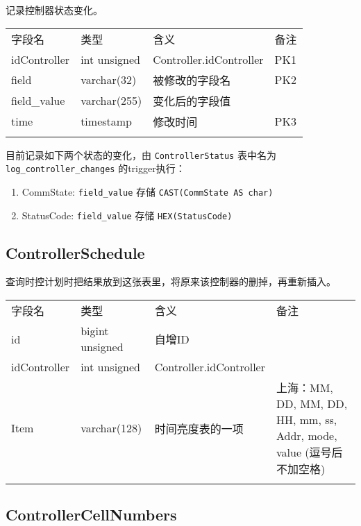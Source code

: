 记录控制器状态变化。

\begin{longtabu}[c]{@{}lXXX@{}}
\toprule\addlinespace
字段名 & 类型 & 含义 & 备注
\\\addlinespace
\midrule\endhead
idController & int unsigned & Controller.idController & PK1
\\\addlinespace
field & varchar(32) & 被修改的字段名 & PK2
\\\addlinespace
field\_value & varchar(255) & 变化后的字段值
\\\addlinespace
time & timestamp & 修改时间 & PK3
\\\addlinespace
\bottomrule
\end{longtabu}

目前记录如下两个状态的变化，由 \texttt{ControllerStatus} 表中名为
\texttt{log\_controller\_changes} 的trigger执行：

\begin{enumerate}
\def\labelenumi{\arabic{enumi}.}
\itemsep1pt\parskip0pt
\item
  CommState: \texttt{field\_value} 存储 \texttt{CAST(CommState AS char)}
\item
  StatusCode: \texttt{field\_value} 存储 \texttt{HEX(StatusCode)}
\end{enumerate}

\subsection{ControllerSchedule}\label{controllerschedule}

查询时控计划时把结果放到这张表里，将原来该控制器的删掉，再重新插入。

\begin{longtabu}[c]{@{}lXXX@{}}
\toprule\addlinespace
字段名 & 类型 & 含义 & 备注
\\\addlinespace
\midrule\endhead
id & bigint unsigned & 自增ID &
\\\addlinespace
idController & int unsigned & Controller.idController &
\\\addlinespace
Item & varchar(128) & 时间亮度表的一项 & 上海：MM, DD, MM, DD, HH, mm,
ss, Addr, mode, value (逗号后不加空格)
\\\addlinespace
\bottomrule
\end{longtabu}

\subsection{ControllerCellNumbers}\label{controllercellnumbers}

